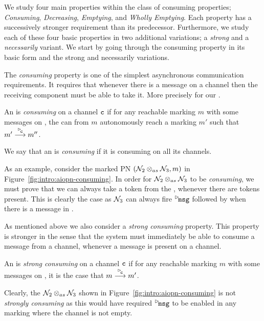 We study four main properties within the class of consuming properties;
    \emph{Consuming},
    \emph{Decreasing},
    \emph{Emptying}, and
    \emph{Wholly Emptying}.
Each property has a successively stronger requirement than its predecessor. Furthermore, we study each of these four basic properties in two additional variations; a \emph{strong} and a \emph{necessarily} variant. We start by going through the consuming property in its basic form and the strong and necessarily variations.

The \emph{consuming} property is one of the simplest asynchronous communication requirements. It requires that whenever there is a message on a channel then the receiving component must be able to take it. More precisely for our \AIOPNs.

\begin{definition}[Consuming]
    An \AIOPN is \emph{consuming} on a channel $\mathtt{c}$ if for any reachable marking $m$ with some messages on , the \AIOPN can from $m$ autonomously reach a marking $m'$ such that $ m' \goes{\inact{\transition{c}}} m''$. 
\end{definition}

We say that an \AIOPN is \emph{consuming} if it is consuming on all its channels.

As an example, consider the marked PN $(\mathcal{N}_2\otimes_{as}\mathcal{N}_3, m)$ in Figure~\ref{fig:intro:aiopn-consuming}. In order for $\mathcal{N}_2\otimes_{as}\mathcal{N}_3$ to be \emph{consuming}, we must prove that we can always take a token from the , whenever there are tokens present. This is clearly the case as $\mathcal{N}_3$ can always fire $\transition{\inact{msg}}$ followed by  when there is a message in . 

As mentioned above we also consider a \emph{strong consuming} property. This property is stronger in the sense that the system must immediately be able to consume a message from a channel, whenever a message is present on a channel. 
\begin{definition}
    An \AIOPN is \emph{strong consuming} on a channel $\mathtt{c}$ if for any reachable marking $m$ with some messages on , it is the case that $ m \goes{\inact{\transition{c}}} m'$. 
\end{definition}
Clearly, the $\mathcal{N}_2\otimes_{as}\mathcal{N}_3$ shown in Figure~\ref{fig:intro:aiopn-consuming} is not \emph{strongly consuming} as this would have required $\inact{\transition{msg}}$ to be enabled in any marking where the channel  is not empty.


